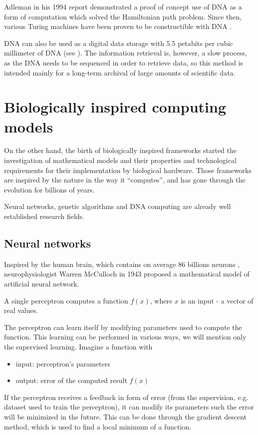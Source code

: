 Adleman in his 1994 report \cite{Adleman1994MolecularComputation} demonstrated a proof of concept use of DNA as a form of computation which solved the Hamiltonian path problem. Since then, various Turing machines have been proven to be constructible with DNA \cite{Kari2000DNAPCP}. 

DNA can also be used as a digital data storage with 5.5 petabits per cubic millimeter of DNA (see \cite{Church2012DNAStorage}). The information retrieval is, however, a slow process, as the DNA needs to be sequenced in order to retrieve data, so this method is intended mainly for a long-term archival of large amounts of scientific data.


\section{Biologically inspired computing models} %
\label{sec:biologically_inspired_computing_models}

On the other hand, the birth of biologically inspired frameworks started the investigation of mathematical models and their properties and technological requirements for their implementation by biological hardware.
Those frameworks are inspired by the nature in the way it ``computes'', and has gone through the evolution for billions of years.

Neural networks, genetic algorithms and DNA computing are already well established research fields.

\subsection{Neural networks} %
\label{sub:neural_networks}

Inspired by the human brain, which contains on average 86 billions neurons \cite{Azevedo09NumberOfNeurons}, neurophysiologist Warren McCulloch in 1943 proposed a mathematical model of artificial  neural network.

A single perceptron computes a function $f(x)$, where $x$ is an input - a vector of real values.

The perceptron can learn itself by modifying parameters used to compute the function. This learning can be performed in various ways, we will mention only the supervised learning. Imagine a function with
\begin{itemize}
  \item input: perceptron's parameters
  \item output: error of the computed result $f(x)$
\end{itemize}
If the perceptron receives a feedback in form of error (from the supervision, e.g. dataset used to train the perceptron), it can modify its parameters such the error will be minimized in the future. This can be done through the gradient descent method, which is used to find a local minimum of a function.

